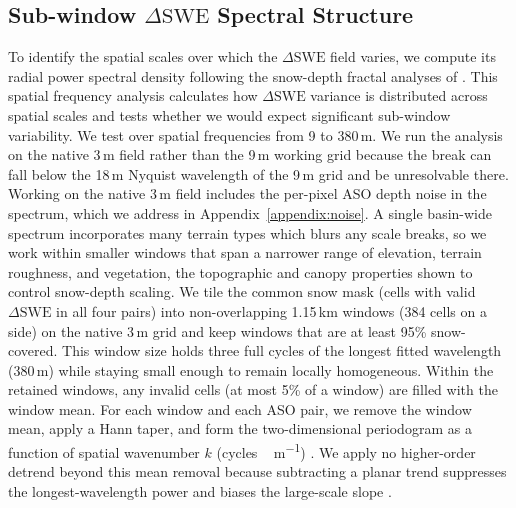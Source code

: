 \documentclass[tc, manuscript]{copernicus}
\begin{document}
\subsection{Sub-window $\Delta\mathrm{SWE}$ Spectral Structure}\label{subsec:psd}

To identify the spatial scales over which the $\Delta\mathrm{SWE}$ field varies, we compute its radial power spectral density following the snow-depth fractal analyses of \citet{trujillo2007topographic-0ec}. This spatial frequency analysis calculates how $\Delta\mathrm{SWE}$ variance is distributed across spatial scales and tests whether we would expect significant sub-window variability. We test over spatial frequencies from 9 to 380\,\unit{m}. We run the analysis on the native 3\,\unit{m} field rather than the 9\,\unit{m} working grid because the break can fall below the 18\,\unit{m} Nyquist wavelength of the 9\,\unit{m} grid and be unresolvable there.  Working on the native 3\,\unit{m} field includes the per-pixel ASO depth noise in the spectrum, which we address in Appendix~\ref{appendix:noise}. A single basin-wide spectrum incorporates many terrain types which blurs any scale breaks, so we work within smaller windows that span a narrower range of elevation, terrain roughness, and vegetation, the topographic and canopy properties shown to control snow-depth scaling. We tile the common snow mask (cells with valid $\Delta\mathrm{SWE}$ in all four pairs) into non-overlapping 1.15\,\unit{km} windows (384 cells on a side) on the native 3\,\unit{m} grid and keep windows that are at least 95\% snow-covered. This window size holds three full cycles of the longest fitted wavelength (380\,\unit{m}) while staying small enough to remain locally homogeneous. Within the retained windows, any invalid cells (at most 5\% of a window) are filled with the window mean. For each window and each ASO pair, we remove the window mean, apply a Hann taper, and form the two-dimensional periodogram as a function of spatial wavenumber $k$ (\unit{cycles\,m^{-1}}) \citep{harris1978use-0d1}. We apply no higher-order detrend beyond this mean removal because subtracting a planar trend suppresses the longest-wavelength power and biases the large-scale slope \citep{deems2006}.
\end{document}
